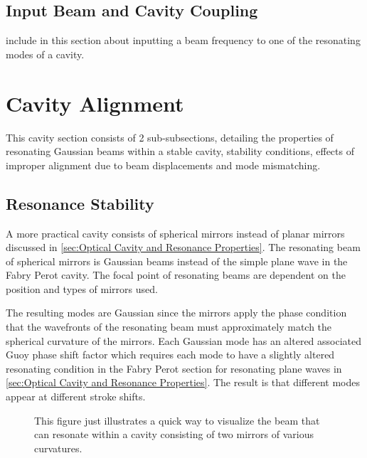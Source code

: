 \documentclass[11pt,a4paper]{book}
\newcommand{\imginput}[1]{} %
\begin{document}
		\subsection{Input Beam and Cavity Coupling}
			include in this section about inputting a beam frequency to one of the resonating modes of a cavity.
	\section{Cavity Alignment}
		\label{sec:Cavity Alignment}
		This cavity section consists of 2 sub-subsections, detailing the properties of resonating Gaussian beams within a stable cavity, stability conditions, effects of improper alignment due to beam displacements and mode mismatching.
	
		\subsection {Resonance Stability}
			\label{ssec:ResonaceSability}
			A more practical cavity consists of spherical mirrors instead of planar mirrors discussed in \autoref{sec:Optical Cavity and Resonance Properties}. 
			The resonating beam of spherical mirrors is Gaussian beams instead of the simple plane wave in the Fabry Perot cavity. The focal point of resonating beams are dependent on the position and types of mirrors used. 
			
			The resulting modes are Gaussian since the mirrors apply the phase condition that the wavefronts of the resonating beam must approximately match the spherical curvature of the mirrors.
			Each Gaussian mode has an altered associated Guoy phase shift factor which requires each mode to have a slightly altered resonating condition in the Fabry Perot section for resonating plane waves in \autoref{sec:Optical Cavity and Resonance Properties}. The result is that different modes appear at different stroke shifts.
			
			\begin{figure} [!ht]
				\centering
				\def\svgwidth{\columnwidth}
				\resizebox{160mm}{!}{\imginput{images/cav-types.pdf_tex}}
				\caption{This figure just illustrates a quick way to visualize the beam that can resonate within a cavity consisting of two mirrors of various curvatures.
				}
				\label{fig:cav-types}
			\end{figure}	
			
\end{document}
